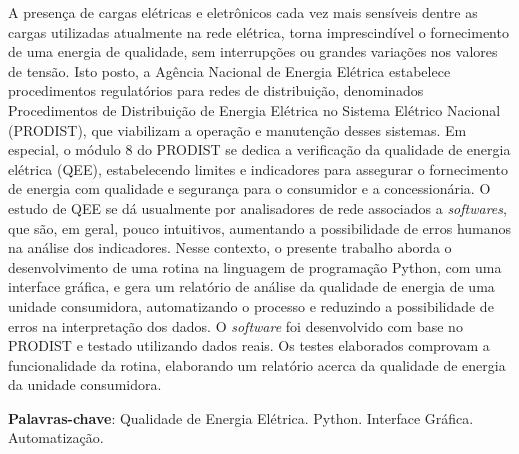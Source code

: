 \begin{resumo}[RESUMO]
  \begin{SingleSpacing}
    A presença de cargas elétricas e eletrônicos cada vez mais sensíveis dentre as cargas utilizadas atualmente na rede elétrica, torna imprescindível o fornecimento de uma energia de qualidade, sem interrupções ou grandes variações nos valores de tensão. Isto posto, a Agência Nacional de Energia Elétrica estabelece procedimentos regulatórios para redes de distribuição, denominados Procedimentos de Distribuição de Energia Elétrica no Sistema Elétrico Nacional (PRODIST), que viabilizam a operação e manutenção desses sistemas. Em especial, o módulo 8 do PRODIST se dedica a verificação da qualidade de energia elétrica (QEE), estabelecendo limites e indicadores para assegurar o fornecimento de energia com qualidade e segurança para o consumidor e a concessionária. O estudo de QEE se dá usualmente por analisadores de rede associados a \textit{softwares}, que são, em geral, pouco intuitivos, aumentando a possibilidade de erros humanos na análise dos indicadores. Nesse contexto, o presente trabalho aborda o desenvolvimento de uma rotina na linguagem de programação Python, com uma interface gráfica, e gera um relatório de análise da qualidade de energia de uma unidade consumidora, automatizando o processo e reduzindo a possibilidade de erros na interpretação dos dados. O \textit{software} foi desenvolvido com base no PRODIST e testado utilizando dados reais. Os testes elaborados comprovam a funcionalidade da rotina, elaborando um relatório acerca da qualidade de energia da unidade consumidora.
  \end{SingleSpacing}

  \vspace{\onelineskip}
  \textbf{Palavras-chave}: Qualidade de Energia Elétrica. Python. Interface Gráfica. Automatização.
\end{resumo}
